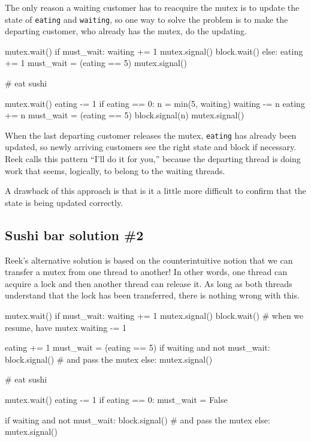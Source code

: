 \documentclass{book}
\begin{document}
The only reason a waiting customer has to reacquire the mutex
is to update the state of {\tt eating} and {\tt waiting}, so
one way to solve the problem is to make the departing customer,
who already has the mutex, do the updating.


\begin{unbreakable}[title={Sushi bar solution \#1}]{}
mutex.wait()
if must_wait:
    waiting += 1
    mutex.signal()
    block.wait()
else:
    eating += 1
    must_wait = (eating == 5)
    mutex.signal()

# eat sushi

mutex.wait()
eating -= 1
if eating == 0:
    n = min(5, waiting)
    waiting -= n
    eating += n
    must_wait = (eating == 5)
    block.signal(n)
mutex.signal()
\end{unbreakable}

When the last departing customer releases the mutex,
{\tt eating} has already been updated, so newly arriving customers
see the right state and block if necessary.  Reek calls this
pattern ``I'll do it for you,'' because the departing thread
is doing work that seems, logically, to belong to the waiting
threads.

A drawback of this approach is that is it a little more difficult
to confirm that the state is being updated correctly.



\subsection {Sushi bar solution \#2}

Reek's alternative solution is based on the counterintuitive
notion that we can transfer a mutex from one thread to another!
In other words, one thread can acquire a lock and then another
thread can release it.  As long as both threads understand
that the lock has been transferred, there is nothing wrong with
this.


\begin{unbreakable}[title={Sushi bar solution \#2}]{}
mutex.wait()
if must_wait:
 waiting += 1
 mutex.signal()
 block.wait() # when we resume, have mutex
 waiting -= 1

eating += 1
must_wait = (eating == 5)
if waiting and not must_wait:
 block.signal() # and pass the mutex
else:
 mutex.signal()

# eat sushi

mutex.wait()
eating -= 1
if eating == 0: must_wait = False

if waiting and not must_wait:
 block.signal() # and pass the mutex
else:
 mutex.signal()
\end{unbreakable}
\end{document}
